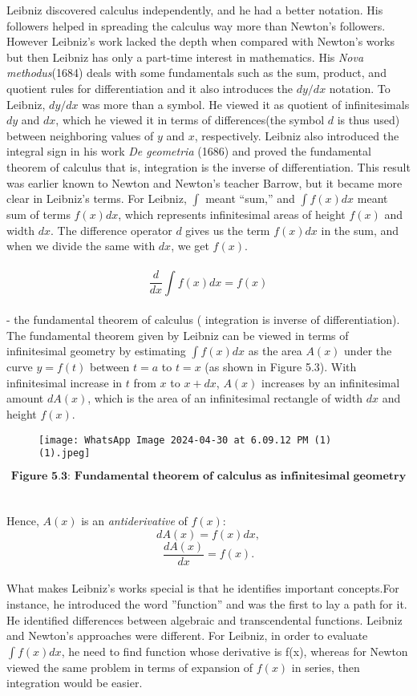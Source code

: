 \documentclass[a4paper,reqno,11pt]{book}
\theoremstyle{plain}%
\theoremstyle{definition}
\begin{document}
\indent Leibniz discovered calculus independently, and he had a better notation. His followers helped in spreading the calculus way more than Newton's followers. However Leibniz’s work lacked the depth when compared with Newton's works but then Leibniz has only a part-time interest in mathematics. His \textit{Nova methodus}(1684) deals with some fundamentals such as the sum, product, and quotient rules for differentiation and it also introduces the $dy/dx$ notation. To Leibniz, $dy/dx$ was more than a symbol. He viewed it as quotient of infinitesimals $dy$ and $dx$, which he viewed it in terms of differences(the symbol $d$ is thus used) between neighboring values of $y$ and $x$, respectively.
Leibniz also introduced the integral sign in his work \textit{De geometria} (1686) and
proved the fundamental theorem of calculus that is, integration is the inverse
of differentiation. This result was earlier known to Newton and Newton’s teacher Barrow, but it became more clear in Leibniz's terms. For Leibniz, $\int$ meant “sum,” and $\int f(x) dx$ meant sum of terms $f(x)dx$, which represents infinitesimal areas of height
$f(x)$ and width $dx$. The difference operator $d$ gives us the term $f(x) dx$
in the sum, and when we divide the same with $dx$, we get $f(x)$. \\
\\
$$\frac{d}{dx}\int f(x) dx = f(x)$$\\
- the fundamental theorem of calculus ( integration is inverse of differentiation).
The fundamental theorem given by Leibniz can be viewed in terms of infinitesimal geometry by estimating $\int f(x) dx$ as the area $A(x)$ under the curve $y = f(t)$
between $t = a$ to $t = x$ (as shown in Figure 5.3). With infinitesimal increase in $t$ from $x$ to $x + dx$, $A(x)$ increases by an infinitesimal amount $dA(x)$, which is the area of an infinitesimal rectangle of width $dx$ and height $f(x)$.
\begin{figure}
\texttt{[image: WhatsApp Image 2024-04-30 at 6.09.12 PM (1) (1).jpeg]}
\centering
\end{figure}
$$\textbf{Figure 5.3: Fundamental theorem of calculus as infinitesimal geometry}$$
\\
\\
Hence, $A(x)$ is an \textit{antiderivative} of $f(x)$:\\
$$dA(x) = f(x)dx,$$
$$\frac{dA(x)}{dx} = f(x).$$
\\
What makes Leibniz's works special is that he identifies important concepts.For instance, he introduced the word ''function” and was the first to lay a path for it. He identified differences between algebraic and transcendental functions. Leibniz and Newton's approaches were different. For Leibniz, in order to evaluate $\int f(x) dx$, he need to find function whose derivative is f(x), whereas for Newton viewed the same problem in terms of expansion of $f(x)$ in series, then integration would be easier.\\
\end{document}
